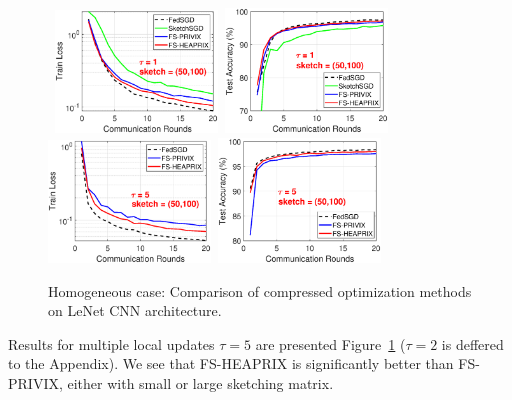 \documentclass[twoside]{article}
\begin{document}
\begin{figure}[t]
\begin{center}
{		}
		\mbox{
		\includegraphics[width=1.7in]{MNIST_figures/local1_sketch50_iid1_train_loss.eps} \hspace{-0.2in}
		\includegraphics[width=1.7in]{MNIST_figures/local1_sketch50_iid1_test_acc.eps} \hspace{-0.2in}
		}
		\mbox{
		\includegraphics[width=1.7in]{MNIST_figures/local5_sketch50_iid1_train_loss.eps}\hspace{-0.2in}
		\includegraphics[width=1.7in]{MNIST_figures/local5_sketch50_iid1_test_acc.eps}\hspace{-0.2in}
		}
	\end{center}
	\caption{Homogeneous case: Comparison of compressed optimization methods on LeNet CNN architecture.}
    \label{fig:MNIST-iid1}
\end{figure}
Results for multiple local updates $\tau=5$ are presented Figure~\ref{fig:MNIST-iid1} ($\tau=2$ is deffered to the Appendix). 
We see that FS-HEAPRIX is significantly better than FS-PRIVIX, either with small or large sketching matrix. 
\end{document}
